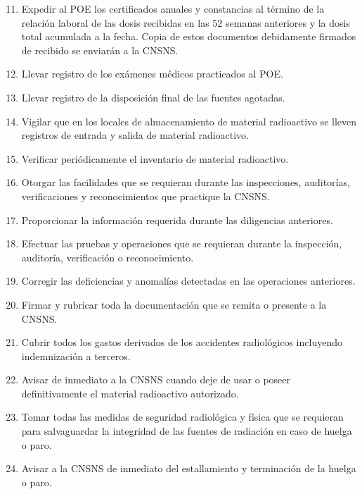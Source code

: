 \begin{enumerate}
    \setcounter{enumi}{10}
    \item Expedir al POE los certificados anuales y constancias al término de la relación laboral de las dosis recibidas en las 52 semanas anteriores y la dosis total acumulada a la fecha. Copia de estos documentos debidamente firmados de recibido se enviarán a la CNSNS.
    \item Llevar registro de los exámenes médicos practicados al POE.
    \item Llevar registro de la disposición final de las fuentes agotadas.
    \item Vigilar que en los locales de almacenamiento de material radioactivo se lleven registros de entrada y salida de material radioactivo.
    \item Verificar periódicamente el inventario de material radioactivo.
    \item Otorgar las facilidades que se requieran durante las inspecciones, auditorías, verificaciones y reconocimientos que practique la CNSNS.
    \item Proporcionar la información requerida durante las diligencias anteriores.
    \item Efectuar las pruebas y operaciones que se requieran durante la inspección, auditoría, verificación o reconocimiento.
    \item Corregir las deficiencias y anomalías detectadas en las operaciones anteriores.
    \item Firmar y rubricar toda la documentación que se remita o presente a la CNSNS.
    \item Cubrir todos los gastos derivados de los accidentes radiológicos incluyendo indemnización a terceros.
    \item Avisar de inmediato a la CNSNS cuando deje de usar o poseer definitivamente el material radioactivo autorizado.
    \item Tomar todas las medidas de seguridad radiológica y física que se requieran para salvaguardar la integridad de las fuentes de radiación en caso de huelga o paro.
    \item Avisar a la CNSNS de inmediato del estallamiento y terminación de la huelga o paro.
\end{enumerate}